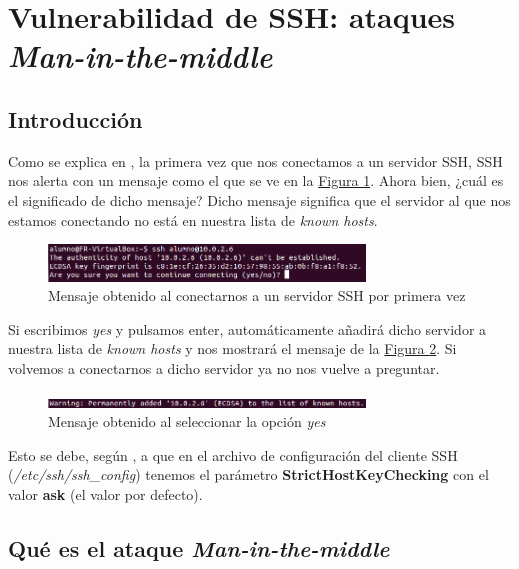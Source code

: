 \documentclass[10pt,a4paper,spanish]{article}
\begin{document}
\newpage

\section{Vulnerabilidad de SSH: ataques \textit{Man-in-the-middle}}
\subsection{Introducción}
\label{intro}
Como se explica en \cite{sshbiblio}, la primera vez que nos conectamos a un servidor SSH, SSH nos alerta con un mensaje como el que se ve en la \hyperref[sshprimeravez]{Figura \ref*{sshprimeravez}}. Ahora bien, ¿cuál es el significado de dicho mensaje? Dicho mensaje significa que el servidor al que nos estamos conectando no está en nuestra lista de \textit{known hosts}. 

\begin{figure}[!h]
    \centering
    \includegraphics[width=0.75\textwidth]{primeravezssh}
    \caption{Mensaje obtenido al conectarnos a un servidor SSH por primera vez}
    \label{sshprimeravez}
\end{figure}

Si escribimos \textit{yes} y pulsamos enter, automáticamente añadirá dicho servidor a nuestra lista de \textit{known hosts} y nos mostrará el mensaje de la \hyperref[knownhost]{Figura \ref*{knownhost}}. Si volvemos a conectarnos a dicho servidor ya no nos vuelve a preguntar.

\begin{figure}[!h]
    \centering
    \includegraphics[width=0.75\textwidth]{knownhosts}
    \caption{Mensaje obtenido al seleccionar la opción \textit{yes}}
    \label{knownhost}
\end{figure}

Esto se debe, según \cite{valenciano}, a que en el archivo de configuración del cliente SSH (\textit{/etc/ssh/ssh\_config}) tenemos el parámetro \textbf{StrictHostKeyChecking} con el valor \textbf{ask} (el valor por defecto). 

\subsection{Qué es el ataque \textit{Man-in-the-middle}}
\end{document}
